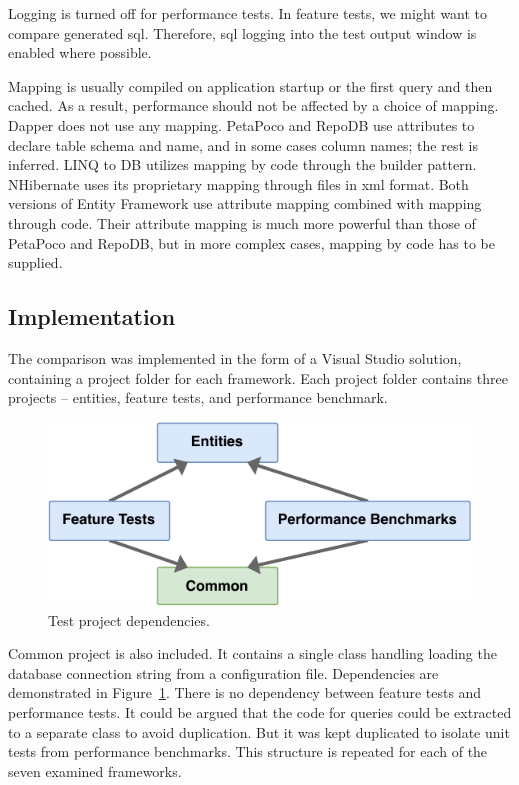 Logging is turned off for performance tests. In feature tests, we might want to compare generated \acrshort{sql}. Therefore, \acrshort{sql} logging into the test output window is enabled where possible.

Mapping is usually compiled on application startup or the first query and then cached. As a result, performance should not be affected by a choice of mapping. Dapper does not use any mapping. PetaPoco and RepoDB use attributes to declare table schema and name, and in some cases column names; the rest is inferred. LINQ to DB utilizes mapping by code through the builder pattern. NHibernate uses its proprietary mapping through files in \acrshort{xml} format. Both versions of Entity Framework use attribute mapping combined with mapping through code. Their attribute mapping is much more powerful than those of PetaPoco and RepoDB, but in more complex cases, mapping by code has to be supplied.

\subsection{Implementation}
The comparison was implemented in the form of a Visual Studio solution, containing a project folder for each framework. Each project folder contains three projects -- entities, feature tests, and performance benchmark. 

\begin{figure}[htp]
  \centering
  \includegraphics[scale=1]{thesis/img/thesis/01_test_dependencies.drawio.pdf}
  \caption{Test project dependencies.}
  \label{fig:test_project_dependencies}
\end{figure}

Common project is also included. It contains a single class handling loading the database connection string from a configuration file. Dependencies are demonstrated in Figure~\ref{fig:test_project_dependencies}. There is no dependency between feature tests and performance tests. It could be argued that the code for queries could be extracted to a separate class to avoid duplication. But it was kept duplicated to isolate unit tests from performance benchmarks. This structure is repeated for each of the seven examined frameworks.

